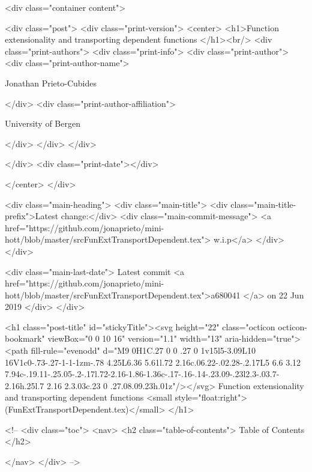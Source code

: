      <div class="container content">
        







<div class="post">
  <div class="print-version">
    <center>
      <h1>Function extensionality and transporting dependent functions </h1><br/>
        <div class="print-authors">
          <div class="print-info">
            <div class="print-author">
              <div class="print-author-name">
                
                  Jonathan Prieto-Cubides
                
              </div>
              <div class="print-author-affiliation">
                
                  University of Bergen
                
                </div>
            </div>
          </div>
          
          
        </div>
        <div class="print-date"></div>
        
        
    </center>
  </div>

  
  <div class="main-heading">
    <div class="main-title">
      <div class="main-title-prefix">Latest change:</div>
      <div class="main-commit-message">
            <a href="https://github.com/jonaprieto/mini-hott/blob/master/srcFunExtTransportDependent.tex">
              w.i.p</a>
      </div>
    </div>

    <div class="main-last-date">
      Latest commit <a href="https://github.com/jonaprieto/mini-hott/blob/master/srcFunExtTransportDependent.tex">a680041 </a> on  22 Jun 2019
    </div>
  </div>
  

  <h1 class="post-title" id="stickyTitle"><svg height="22" class="octicon octicon-bookmark" viewBox="0 0 10 16" version="1.1" width="13" aria-hidden="true"><path fill-rule="evenodd" d="M9 0H1C.27 0 0 .27 0 1v15l5-3.09L10 16V1c0-.73-.27-1-1-1zm-.78 4.25L6.36 5.61l.72 2.16c.06.22-.02.28-.2.17L5 6.6 3.12 7.94c-.19.11-.25.05-.2-.17l.72-2.16-1.86-1.36c-.17-.16-.14-.23.09-.23l2.3-.03.7-2.16h.25l.7 2.16 2.3.03c.23 0 .27.08.09.23h.01z"/></svg> Function extensionality and transporting dependent functions  <small style="float:right">(FunExtTransportDependent.tex)</small>
  </h1>

  <!-- 
  <div class="toc">
    <nav>
    <h2 class="table-of-contents"> Table of Contents </h2>
      

    </nav>
  </div>
   -->

